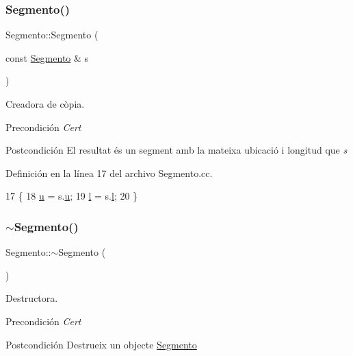 \subsubsection{\texorpdfstring{Segmento()}{Segmento()}\hspace{0.1cm}{\footnotesize\ttfamily [3/3]}}
{\footnotesize\ttfamily Segmento\+::\+Segmento (\begin{DoxyParamCaption}\item[{const \hyperlink{class_segmento}{Segmento} \&}]{s }\end{DoxyParamCaption})}



Creadora de còpia. 

\begin{DoxyPrecond}{Precondición}
{\itshape Cert} 
\end{DoxyPrecond}
\begin{DoxyPostcond}{Postcondición}
El resultat és un segment amb la mateixa ubicació i longitud que {\itshape s} 
\end{DoxyPostcond}


Definición en la línea 17 del archivo Segmento.\+cc.


\begin{DoxyCode}
17                                     \{
18   \hyperlink{class_segmento_a7fab9490df9b1b655bb88c2deb6e72ef}{u} = s.\hyperlink{class_segmento_a7fab9490df9b1b655bb88c2deb6e72ef}{u};
19   \hyperlink{class_segmento_a8b59abc9de156b52370dd759beab031d}{l} = s.\hyperlink{class_segmento_a8b59abc9de156b52370dd759beab031d}{l};
20 \}
\end{DoxyCode}
\mbox{\label{class_segmento_a7a9ecb38532ea633aacdaa90be7c4769}} 
\subsubsection{\texorpdfstring{$\sim$\+Segmento()}{~Segmento()}}
{\footnotesize\ttfamily Segmento\+::$\sim$\+Segmento (\begin{DoxyParamCaption}{ }\end{DoxyParamCaption})}



Destructora. 

\begin{DoxyPrecond}{Precondición}
{\itshape Cert} 
\end{DoxyPrecond}
\begin{DoxyPostcond}{Postcondición}
Destrueix un objecte \hyperlink{class_segmento}{Segmento} 
\end{DoxyPostcond}


